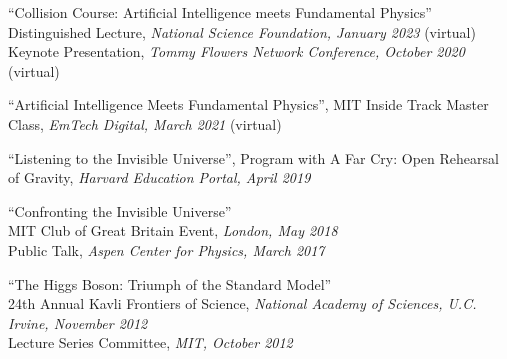 \bbl

\item ``Collision Course: Artificial Intelligence meets Fundamental Physics''
\\ Distinguished Lecture, \emph{National Science Foundation, January 2023} (virtual)
\\ Keynote Presentation, \emph{Tommy Flowers Network Conference, October 2020} (virtual)

\item ``Artificial Intelligence Meets Fundamental Physics'', MIT Inside Track Master Class, \emph{EmTech Digital, March 2021} (virtual)

\item ``Listening to the Invisible Universe'', Program with A Far Cry: Open Rehearsal of Gravity, \emph{Harvard Education Portal, April 2019}

\item ``Confronting the Invisible Universe''
\\ MIT Club of Great Britain Event, \emph{London, May 2018}
\\ Public Talk, \emph{Aspen Center for Physics, March 2017}

\item ``The Higgs Boson:  Triumph of the Standard Model''
\\ 24th Annual Kavli Frontiers of Science, \emph{National Academy of Sciences, U.C. Irvine, November 2012}
\\ Lecture Series Committee, \emph{MIT, October 2012}

\el
